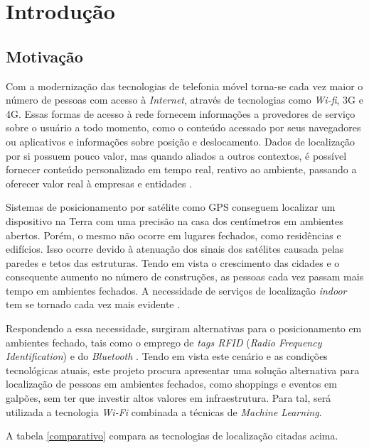 \chapter{Introdução}\label{chp:introduction}

\section{Motivação}\label{sec:motivation}
Com a modernização das tecnologias de telefonia móvel torna-se cada vez maior o
número de pessoas com acesso à \textit{Internet}, através de tecnologias como \textit{Wi-fi}, 3G e 4G. Essas formas de acesso à rede fornecem informações a provedores de serviço sobre o usuário a todo momento, como o conteúdo acessado por seus navegadores ou aplicativos
e informações sobre posição e deslocamento. Dados de localização por si possuem
pouco valor, mas quando aliados a outros contextos, é possível fornecer conteúdo
personalizado em tempo real, reativo ao ambiente, passando a oferecer valor real à empresas e entidades \cite{evaluation}.
\par
Sistemas de posicionamento por satélite como GPS conseguem localizar um dispositivo
na Terra com uma precisão na casa dos centímetros em ambientes abertos. Porém,
o mesmo não ocorre em lugares fechados, como residências e edifícios. Isso ocorre
devido à atenuação dos sinais dos satélites causada pelas paredes e tetos das
estruturas. Tendo em vista o crescimento das cidades e o consequente aumento no
número de construções, as pessoas cada vez passam mais tempo em ambientes
fechados. A necessidade de serviços de localização \textit{indoor} tem se tornado cada
vez mais evidente \cite{situationIndoor}.
\par
Respondendo a essa necessidade, surgiram alternativas para o posicionamento em
ambientes fechado, tais como o emprego de \textit{tags RFID} (\textit{Radio Frequency Identification}) e do \textit{Bluetooth} \cite{evaluation}. Tendo em vista este
cenário e as condições tecnológicas atuais, este projeto procura apresentar uma
solução alternativa para localização de pessoas em ambientes fechados, como shoppings e
eventos em galpões, sem ter que investir altos valores em infraestrutura. Para tal, será utilizada a tecnologia \textit{Wi-Fi} combinada a técnicas de \textit{Machine Learning}.
\par
A tabela \ref{comparativo} compara as tecnologias de localização citadas acima.


